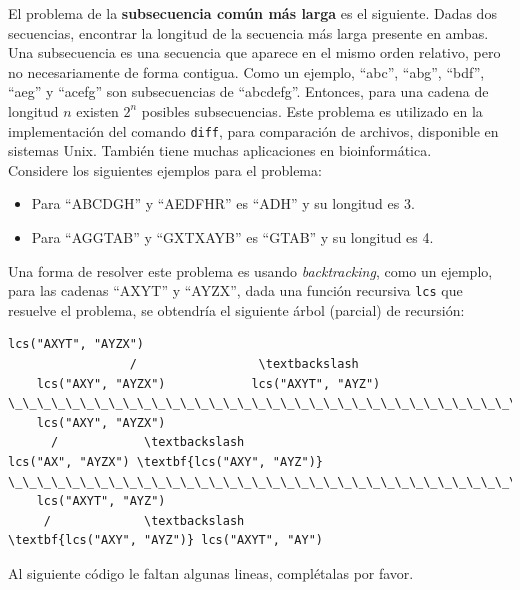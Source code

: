 \documentclass[twocolumn]{article}
\begin{document}
El problema de la \textbf{subsecuencia común más larga} es el siguiente. Dadas dos secuencias, encontrar la longitud de la secuencia más larga presente en ambas.
Una subsecuencia es una secuencia que aparece en el mismo orden relativo, pero no necesariamente de forma contigua. Como un ejemplo, ``abc'', ``abg'', ``bdf'',
``aeg'' y ``acefg'' son subsecuencias de ``abcdefg''. Entonces, para una cadena de longitud $n$ existen $2^n$ posibles subsecuencias. Este problema es utilizado
en la implementación del comando \texttt{diff}, para comparación de archivos, disponible en sistemas Unix.  También tiene muchas aplicaciones en bioinformática. \\

\noindent
Considere los siguientes ejemplos para el problema:
\begin{itemize}
\item Para ``ABCDGH'' y ``AEDFHR'' es ``ADH'' y su longitud es 3.
\item Para ``AGGTAB'' y ``GXTXAYB'' es ``GTAB'' y su longitud es 4.\\
\end{itemize}

Una forma de resolver este problema es usando \emph{backtracking}, como un ejemplo, para las cadenas  ``AXYT'' y  ``AYZX'', dada una función recursiva \texttt{lcs} 
que resuelve el problema, se obtendría el siguiente árbol (parcial) de recursión:

{\scriptsize
\begin{Verbatim}[commandchars=\\\{\},codes={\catcode`$=3\catcode`_=8}]
                 lcs("AXYT", "AYZX")
                 /                 \textbackslash
    lcs("AXY", "AYZX")            lcs("AXYT", "AYZ")
\_\_\_\_\_\_\_\_\_\_\_\_\_\_\_\_\_\_\_\_\_\_\_\_\_\_\_\_\_\_\_\_\_\_\_\_\_\_\_\_\_\_\_\_\_\_\_\_\_\_\_\_\_\_\_\_\_\_\_\_\_\_\_\_\_\_\_\_\_\_\_\_
    lcs("AXY", "AYZX")          
      /            \textbackslash               
lcs("AX", "AYZX") \textbf{lcs("AXY", "AYZ")}
\_\_\_\_\_\_\_\_\_\_\_\_\_\_\_\_\_\_\_\_\_\_\_\_\_\_\_\_\_\_\_\_\_\_\_\_\_\_\_\_\_\_\_\_\_\_\_\_\_\_\_\_\_\_\_\_\_\_\_\_\_\_\_\_\_\_\_\_\_\_\_\_\_
    lcs("AXYT", "AYZ")
     /             \textbackslash
\textbf{lcs("AXY", "AYZ")} lcs("AXYT", "AY")
\end{Verbatim}
}



Al siguiente código le faltan algunas lineas, complétalas por favor.
\end{document}
